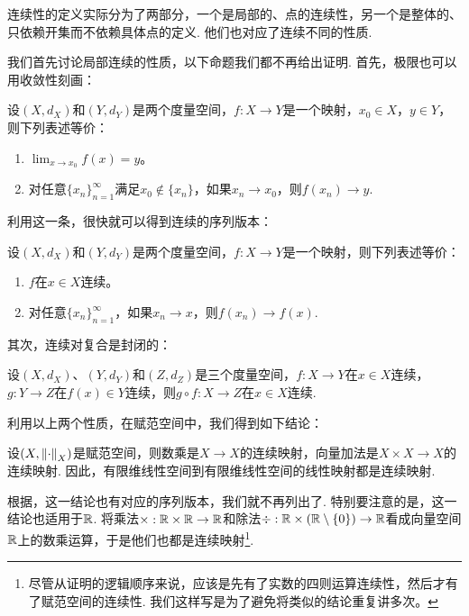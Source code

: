 连续性的定义实际分为了两部分，一个是局部的、点的连续性，另一个是整体的、只依赖开集而不依赖具体点的定义. 他们也对应了连续不同的性质. 

我们首先讨论局部连续的性质，以下命题我们都不再给出证明. 首先，极限也可以用收敛性刻画：

\begin{proposition}\label{prop:limit-converge}
    设$(X,d_X)$和$(Y,d_Y)$是两个度量空间，$f:X\to Y$是一个映射，$x_0\in X$，$y\in Y$，则下列表述等价：
    \begin{enumerate}
        \item $\lim_{x\to x_0}f(x)=y$。
        \item 对任意$\{x_n\}_{n=1}^\infty$满足$x_0\notin\{x_n\}$，如果$x_n\to x_0$，则$f(x_n)\to y$.
    \end{enumerate}
\end{proposition}

利用这一条，很快就可以得到连续的序列版本：

\begin{corollary}\label{cor:continuous-converge}
    设$(X,d_X)$和$(Y,d_Y)$是两个度量空间，$f:X\to Y$是一个映射，则下列表述等价：
    \begin{enumerate}
        \item $f$在$x\in X$连续。
        \item 对任意$\{x_n\}_{n=1}^\infty$，如果$x_n\to x$，则$f(x_n)\to f(x)$.
    \end{enumerate}
\end{corollary}

其次，连续对复合是封闭的：
\begin{proposition}\label{prop:continuous-composition}
    设$(X,d_X)$、$(Y,d_Y)$和$(Z,d_Z)$是三个度量空间，$f:X\to Y$在$x\in X$连续，$g:Y\to Z$在$f(x)\in Y$连续，则$g\circ f:X\to Z$在$x\in X$连续. 
\end{proposition}

利用以上两个性质，在赋范空间中，我们得到如下结论：
\begin{corollary}\label{cor:continuous-linear}
    设$(X,\left\|\cdot\right\|_X)$是赋范空间，则数乘是$X\to X$的连续映射，向量加法是$X\times X\to X$的连续映射. 因此，有限维线性空间到有限维线性空间的线性映射都是连续映射. 
\end{corollary}

根据，这一结论也有对应的序列版本，我们就不再列出了. 特别要注意的是，这一结论也适用于$\mathbb{R}$. 将乘法$\times:\mathbb{R}\times\mathbb{R}\to\mathbb{R}$和除法$\div:\mathbb{R}\times(\mathbb{R}\setminus\{0\})\to\mathbb{R}$看成向量空间$\mathbb{R}$上的数乘运算，于是他们也都是连续映射\footnote{尽管从证明的逻辑顺序来说，应该是先有了实数的四则运算连续性，然后才有了赋范空间的连续性. 我们这样写是为了避免将类似的结论重复讲多次。 }. 

